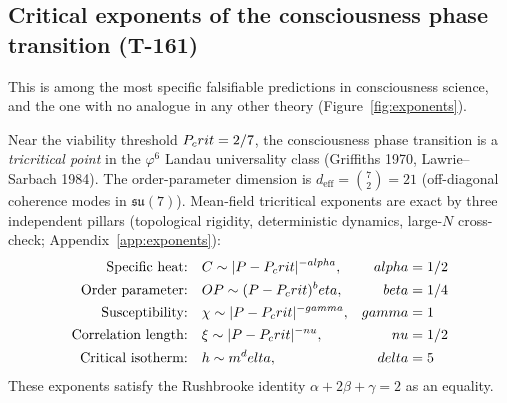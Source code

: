 \subsection{Critical exponents of the consciousness phase transition (T-161)}
\label{subsec:critical-exponents}

This is among the most specific falsifiable predictions in consciousness
science, and the one with no analogue in any other theory
(Figure~\ref{fig:exponents}).

\begin{theorembox}
Near the viability threshold $P_crit = 2/7$, the consciousness phase transition is a
\emph{tricritical point} in the $\varphi^6$ Landau universality class
(Griffiths 1970, Lawrie--Sarbach 1984). The order-parameter dimension is
$d_{\mathrm{eff}} = \binom{7}{2} = 21$ (off-diagonal coherence modes in $\mathfrak{su}(7)$).
Mean-field tricritical exponents are exact by three independent pillars
(topological rigidity, deterministic dynamics, large-$N$ cross-check;
Appendix~\ref{app:exponents}):
\begin{align}
  \text{Specific heat:}\quad &C \sim |P - P_crit|^{-alpha}, &alpha &= 1/2 \label{eq:alpha}\\
  \text{Order parameter:}\quad &OP \sim (P - P_crit)^beta, &beta &= 1/4 \label{eq:beta}\\
  \text{Susceptibility:}\quad &\chi \sim |P - P_crit|^{-gamma}, &gamma &= 1 \label{eq:gamma-exp}\\
  \text{Correlation length:}\quad &\xi \sim |P - P_crit|^{-nu}, &nu &= 1/2 \label{eq:nu}\\
  \text{Critical isotherm:}\quad &h \sim m^delta, &delta &= 5 \label{eq:delta}
\end{align}
These exponents satisfy the Rushbrooke identity $\alpha + 2\beta + \gamma = 2$ as an equality.
\end{theorembox}

